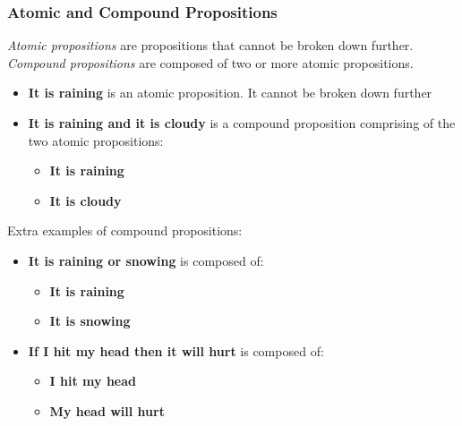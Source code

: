 \documentclass{article}
\begin{document}
\subsubsection{Atomic and Compound Propositions}
\emph{Atomic propositions} are propositions that cannot be broken down further.
\emph{Compound propositions} are composed of two or more atomic propositions.
\begin{itemize}
    \item \textbf{It is raining} is an atomic proposition. It cannot be broken down further
    \item \textbf{It is raining and it is cloudy} is a compound proposition comprising of the two atomic propositions:
    \begin{itemize}
        \item \textbf{It is raining}
        \item \textbf{It is cloudy}
    \end{itemize}
\end{itemize}
Extra examples of compound propositions:
\begin{itemize}
    \item \textbf{It is raining or snowing} is composed of:
    \begin{itemize}
        \item \textbf{It is raining}
        \item \textbf{It is snowing}
    \end{itemize}
    \item \textbf{If I hit my head then it will hurt} is composed of:
    \begin{itemize}
        \item \textbf{I hit my head}
        \item \textbf{My head will hurt}
    \end{itemize}
\end{itemize}
%
\newpage
\end{document}

